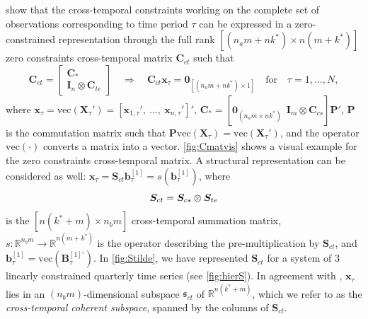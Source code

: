 \documentclass[review, 11pt]{elsarticle}
\newcommand{\bvet}{\bm{b}}
\newcommand{\xvet}{\bm{x}}
\newcommand{\Bvet}{\bm{B}}
\newcommand{\Cvet}{\bm{C}}
\newcommand{\Ivet}{\bm{I}}
\newcommand{\Pvet}{\bm{P}}
\newcommand{\Svet}{\bm{S}}
\newcommand{\Xvet}{\bm{X}}
\newcommand{\Zerovet}{\bm{0}}
\theoremstyle{definition}
\begin{document}
\cite{difonzo2023} show that the cross-temporal constraints working on the complete set of observations corresponding to time period $\tau$ can be expressed in a zero-constrained representation through the full rank $\left[(n_am+nk^\ast)\times n(m+k^\ast)\right]$ zero constraints cross-temporal matrix $\Cvet_{ct}$ such that
\begin{equation}
	\label{eq:Cct}
	\Cvet_{ct} = \begin{bmatrix}
		\Cvet_\ast \\[-0.25cm]
		\Ivet_n \otimes \Cvet_{te}
	\end{bmatrix} \quad \Longrightarrow \quad
	\Cvet_{ct} \xvet_{\tau} = \Zerovet_{[(n_am+nk^\ast)\times1]} \quad \mathrm{for} \quad \tau = 1,\dots,N,
\end{equation}
where $\xvet_{\tau} = \mathrm{vec}(\Xvet_{\tau}') = [\xvet_{1, \tau}',~ 	\dots, ~ \xvet_{n, \tau}']'$, $\Cvet_\ast = [\Zerovet_{(n_a m\times nk^\ast)} ~~ \Ivet_m \otimes \Cvet_{cs}]\Pvet'$, $\Pvet$ is the commutation matrix \citep[][p. 54]{magnus2019} such that $\Pvet \mathrm{vec}(\Xvet_{\tau}) = \mathrm{vec}(\Xvet_{\tau}')$, and the operator $\mathrm{vec}(\cdot)$ converts a matrix into a vector. \autoref{fig:Cmatvis} shows a visual example for the zero constraints cross-temporal matrix.
A structural representation can be considered as well: $\xvet_\tau = \Svet_{ct}\bvet^{[1]}_\tau = s(\bvet_{\tau}^{[1]})$, where \vspace{-0.1cm}
\begin{equation}
	\label{eq:Sct}
	\Svet_{ct} = \Svet_{cs} \otimes \Svet_{te}
	\vspace{-0.1cm}
\end{equation}
is the $\left[n(k^\ast+m)\times n_b m\right]$ cross-temporal summation matrix, $s: \mathbb{R}^{n_b m} \rightarrow \mathbb{R}^{n(m+k^\ast)}$ is the operator describing the pre-multiplication by $\Svet_{ct}$, and $\bvet^{[1]}_\tau = \mathrm{vec}(\Bvet^{[1]\prime}_{\tau})$. In \autoref{fig:Stilde}, we have represented $\Svet_{ct}$ for a system of 3 linearly constrained quarterly time series (see \autoref{fig:hierS}).
In agreement with \cite{panagiotelis2021}, $\xvet_{\tau}$ lies in an $(n_b m)$-dimensional subspace $\mathfrak{s}_{ct}$ of $\mathbb{R}^{n(k^\ast+m)}$, which we refer to as the \textit{cross-temporal coherent subspace}, spanned by the columns of $\Svet_{ct}$.


\end{document}
